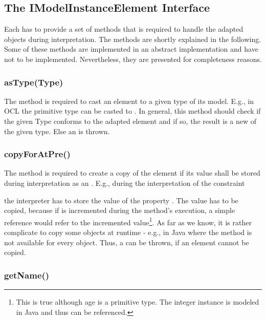 \subsection{The IModelInstanceElement Interface}

Each  has to provide a set of methods that is required to handle the adapted objects during interpretation. The methods are shortly explained in the following. Some of these methods are implemented in an abstract  implementation and have not to be implemented. Nevertheless, they are presented for completeness reasons.

\subsubsection{asType(Type)}

The method  is required to cast an element to a given type of its model. E.g., in \acs{OCL} the primitive type  can be casted to . In general, this method should check if the given Type conforms to the adapted element and if so, the result is a new  of the given type. Else an  is thrown.

\subsubsection{copyForAtPre()} 

The method  is required to create a copy of the element if its value shall be stored during interpretation as an . E.g., during the interpretation of the constraint


the interpreter has to store the value of the property . The value has to be copied, because if  is incremented during the method's execution, a simple reference would refer to the incremented value\footnote{This is true although age is a primitive type. The integer instance is modeled in Java and thus can be referenced.}. As far as we know, it is rather complicate to copy some objects at runtime - e.g., in Java where the  method is not available for every object. Thus, a  can be thrown, if an element cannot be copied.

\subsubsection{getName()}

